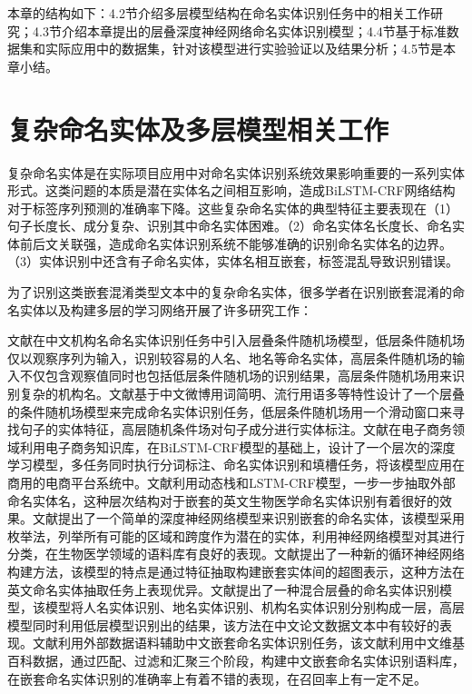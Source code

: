 \documentclass[winfonts,master,oneside,nobackinfo]{njuthesis}
\begin{document}
本章的结构如下：4.2节介绍多层模型结构在命名实体识别任务中的相关工作研究；4.3节介绍本章提出的层叠深度神经网络命名实体识别模型；4.4节基于标准数据集和实际应用中的数据集，针对该模型进行实验验证以及结果分析；4.5节是本章小结。





\section{复杂命名实体及多层模型相关工作}

复杂命名实体是在实际项目应用中对命名实体识别系统效果影响重要的一系列实体形式。这类问题的本质是潜在实体名之间相互影响，造成BiLSTM-CRF网络结构对于标签序列预测的准确率下降。这些复杂命名实体的典型特征主要表现在（1）句子长度长、成分复杂、识别其中命名实体困难。（2）命名实体名长度长、命名实体前后文关联强，造成命名实体识别系统不能够准确的识别命名实体名的边界。（3）实体识别中还含有子命名实体，实体名相互嵌套，标签混乱导致识别错误。

为了识别这类嵌套混淆类型文本中的复杂命名实体，很多学者在识别嵌套混淆的命名实体以及构建多层的学习网络开展了许多研究工作：

文献\cite{junsheng}在中文机构名命名实体识别任务中引入层叠条件随机场模型，低层条件随机场仅以观察序列为输入，识别较容易的人名、地名等命名实体，高层条件随机场的输入不仅包含观察值同时也包括低层条件随机场的识别结果，高层条件随机场用来识别复杂的机构名。文献\cite{Yixue}基于中文微博用词简明、流行用语多等特性设计了一个层叠的条件随机场模型来完成命名实体识别任务，低层条件随机场用一个滑动窗口来寻找句子的实体特征，高层随机条件场对句子成分进行实体标注。文献\cite{taobao}在电子商务领域利用电子商务知识库，在BiLSTM-CRF模型的基础上，设计了一个层次的深度学习模型，多任务同时执行分词标注、命名实体识别和填槽任务，将该模型应用在商用的电商平台系统中。文献\cite{Meizhi}利用动态栈和LSTM-CRF模型，一步一步抽取外部命名实体名，这种层次结构对于嵌套的英文生物医学命名实体识别有着很好的效果。文献\cite{Mohammad}提出了一个简单的深度神经网络模型来识别嵌套的命名实体，该模型采用枚举法，列举所有可能的区域和跨度作为潜在的实体，利用神经网络模型对其进行分类，在生物医学领域的语料库有良好的表现。文献\cite{Arzoo}提出了一种新的循环神经网络构建方法，该模型的特点是通过特征抽取构建嵌套实体间的超图表示，这种方法在英文命名实体抽取任务上表现优异。文献\cite{Jia}提出了一种混合层叠的命名实体识别模型，该模型将人名实体识别、地名实体识别、机构名实体识别分别构成一层，高层模型同时利用低层模型识别出的结果，该方法在中文论文数据文本中有较好的表现。文献\cite{yanqun}利用外部数据语料辅助中文嵌套命名实体识别任务，该文献利用中文维基百科数据，通过匹配、过滤和汇聚三个阶段，构建中文嵌套命名实体识别语料库，在嵌套命名实体识别的准确率上有着不错的表现，在召回率上有一定不足。
\end{document}
